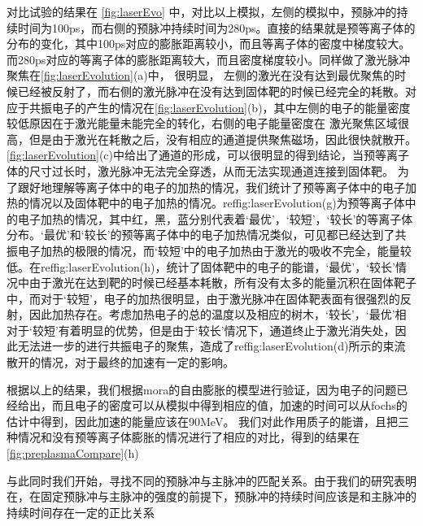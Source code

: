 对比试验的结果在 \ref{fig:laserEvo} 中，对比以上模拟，左侧的模拟中，预脉冲的持续时间为100ps，而右侧的预脉冲持续时间为280ps。直接的结果就是预等离子体的分布的变化，其中100ps对应的膨胀距离较小，而且等离子体的密度中梯度较大。而280ps对应的等离子体的膨胀距离较大，而且密度梯度较小。同样做了激光脉冲聚焦在\ref{fig:laserEvolution}(a)中， 很明显， 左侧的激光在没有达到最优聚焦的时候已经被反射了，而右侧的激光脉冲在没有达到固体靶的时候已经完全的耗散。对应于共振电子的产生的情况在\ref{fig:laserEvolution}(b)，其中左侧的电子的能量密度较低原因在于激光能量未能完全的转化，右侧的电子能量密度在 激光聚焦区域很高，但是由于激光在耗散之后，没有相应的通道提供聚焦磁场，因此很快就散开。\ref{fig:laserEvolution}(c)中给出了通道的形成，可以很明显的得到结论，当预等离子体的尺寸过长时，激光脉冲无法完全穿透，从而无法实现通道连接到固体靶。 为了跟好地理解等离子体中的电子的加热的情况，我们统计了预等离子体中的电子加热的情况以及固体靶中的电子加热的情况。ref{fig:laserEvolution}(g)为预等离子体中的电子加热的情况，其中红，黑，蓝分别代表着‘最优’，‘较短’，‘较长’的等离子体分布。‘最优’和‘较长’的预等离子体中的电子加热情况类似，可见都已经达到了共振电子加热的极限的情况，而‘较短’中的电子加热由于激光的吸收不完全，能量较低。在ref{fig:laserEvolution}(h)，统计了固体靶中的电子的能谱，‘最优’，‘较长’情况中由于激光在达到靶的时候已经基本耗散，所有没有太多的能量沉积在固体靶子中，而对于‘较短’，电子的加热很明显，由于激光脉冲在固体靶表面有很强烈的反射，因此加热存在。考虑加热电子的总的温度以及相应的树木，‘较长’，‘最优’相对于‘较短’有着明显的优势，但是由于‘较长’情况下，通道终止于激光消失处，因此无法进一步的进行共振电子的聚焦，造成了ref{fig:laserEvolution}(d)所示的束流散开的情况，对于最终的加速有一定的影响。




根据以上的结果，我们根据mora的自由膨胀的模型进行验证，因为电子的问题已经给出，而且电子的密度可以从模拟中得到相应的值，加速的时间可以从fochs的估计中得到，因此加速的能量应该在90MeV。 我们对此作用质子的能谱，且把三种情况和没有预等离子体膨胀的情况进行了相应的对比，得到的结果在\ref{fig:preplasmaCompare}(h)






与此同时我们开始，寻找不同的预脉冲与主脉冲的匹配关系。由于我们的研究表明在，在固定预脉冲与主脉冲的强度的前提下，预脉冲的持续时间应该是和主脉冲的持续时间存在一定的正比关系


